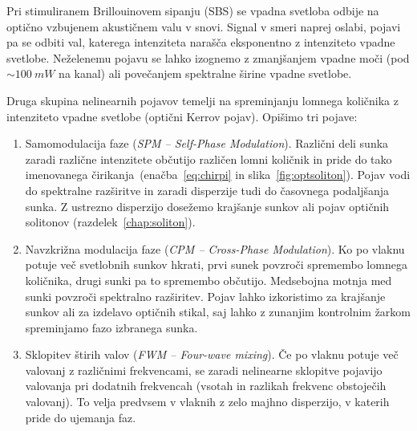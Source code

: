 Pri stimuliranem Brillouinovem sipanju (SBS) se vpadna svetloba
 odbije na 
optično vzbujenem akustičnem valu v snovi. Signal
v smeri naprej oslabi, pojavi pa se odbiti val, katerega intenziteta
narašča eksponentno z intenziteto vpadne svetlobe. 
Neželenemu pojavu se lahko izognemo z zmanjšanjem vpadne
moči (pod $\sim 100~\si{mW}$ na kanal) 
ali povečanjem spektralne širine vpadne svetlobe.

Druga skupina nelinearnih pojavov temelji na spreminjanju 
lomnega količnika z intenziteto vpadne svetlobe (optični Kerrov pojav).
Opišimo tri pojave:
\begin{enumerate}
\item 
Samomodulacija faze ({\it SPM -- Self-Phase Modulation}). Različni deli
sunka zaradi različne intenzitete občutijo različen lomni količnik in pride
do tako imenovanega čirikanja~(enačba~\ref{eq:chirpi} 
in slika~\ref{fig:optsoliton}). 
Pojav vodi do spektralne razširitve in zaradi
disperzije tudi do časovnega podaljšanja sunka. Z ustrezno disperzijo dosežemo 
krajšanje sunkov ali pojav optičnih solitonov (razdelek~\ref{chap:soliton}).
\\
\pagebreak

\item
Navzkrižna modulacija faze ({\it CPM -- Cross-Phase Modulation}). Ko po vlaknu
potuje več svetlobnih sunkov hkrati, prvi sunek povzroči spremembo lomnega količnika, 
drugi sunki pa to spremembo občutijo. Medsebojna motnja med sunki povzroči 
spektralno razširitev. Pojav lahko izkoristimo za krajšanje sunkov ali
za izdelavo optičnih stikal, 
saj lahko z zunanjim kontrolnim žarkom spreminjamo fazo izbranega sunka. \\

\item
Sklopitev štirih valov ({\it FWM -- Four-wave mixing}). Če po vlaknu potuje več
valovanj z različnimi frekvencami, 
se zaradi nelinearne sklopitve pojavijo
valovanja pri dodatnih frekvencah (vsotah in razlikah frekvenc obstoječih valovanj). To velja
predvsem v vlaknih z zelo majhno disperzijo, v katerih pride do ujemanja
faz.  
\end{enumerate}
